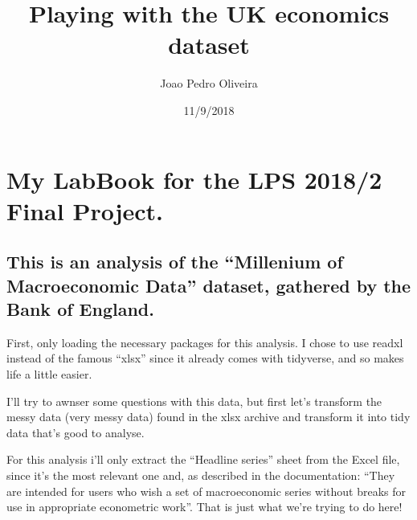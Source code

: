 \documentclass[]{article}
\title{Playing with the UK economics dataset}
\author{Joao Pedro Oliveira}
\date{11/9/2018}
\begin{document}
\maketitle

\section{My LabBook for the LPS 2018/2 Final
Project.}\label{my-labbook-for-the-lps-20182-final-project.}

\subsection{\texorpdfstring{This is an analysis of the ``Millenium of
Macroeconomic Data'' dataset, gathered by the Bank of
England.}{This is an analysis of the Millenium of Macroeconomic Data dataset, gathered by the Bank of England.}}\label{this-is-an-analysis-of-the-millenium-of-macroeconomic-data-dataset-gathered-by-the-bank-of-england.}

First, only loading the necessary packages for this analysis. I chose to
use readxl instead of the famous ``xlsx'' since it already comes with
tidyverse, and so makes life a little easier.

I'll try to awnser some questions with this data, but first let's
transform the messy data (very messy data) found in the xlsx archive and
transform it into tidy data that's good to analyse.

For this analysis i'll only extract the ``Headline series'' sheet from
the Excel file, since it's the most relevant one and, as described in
the documentation: ``They are intended for users who wish a set of
macroeconomic series without breaks for use in appropriate econometric
work''. That is just what we're trying to do here!
\end{document}
